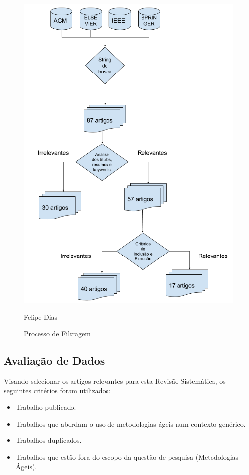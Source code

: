 \begin{figure}
\centering
\includegraphics[width=1\linewidth]{metodologia_gestao.png}
\caption{Processo de Filtragem}
 Felipe Dias
\label{fig:filter}
\end{figure}

\subsection{Avaliação de Dados}

Visando selecionar os artigos relevantes para esta Revisão Sistemática, os seguintes critérios foram utilizados:

\begin{itemize}
\item Trabalho publicado.
\item Trabalhos que abordam o uso de metodologias ágeis num contexto genérico.
\item Trabalhos duplicados.
\item Trabalhos que estão fora do escopo da questão de pesquisa (Metodologias Ágeis).
\end{itemize}

